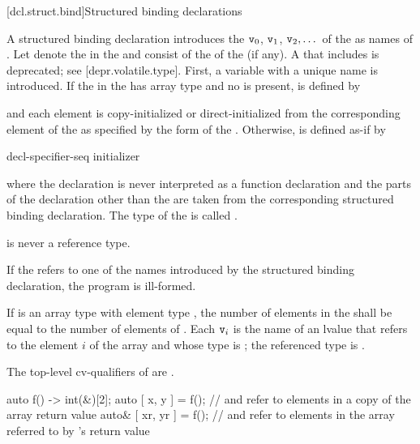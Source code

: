 \documentclass{wg21}
\begin{document}
[dcl.struct.bind]{Structured binding declarations}%

\pnum
A structured binding declaration introduces the 
$\texttt{v}_0$, $\texttt{v}_1$, $\texttt{v}_2, \dotsc$
of the
 as names
of .
Let \cv{} denote the  in
the  and
 consist of the  of
the  (if any).
A \cv{} that includes  is deprecated;
see [depr.volatile.type].
First, a variable with a unique name  is introduced. If the
 in the 
has array type   and no  is present,
 is defined by
\begin{ncbnf}
      \cv{}   \terminal{;}
\end{ncbnf}
and each element is copy-initialized or direct-initialized
from the corresponding element of the  as specified
by the form of the .
Otherwise, 
is defined as-if by
\begin{ncbnf}
     decl-specifier-seq   initializer \terminal{;}
\end{ncbnf}
where
the declaration is never interpreted as a function declaration and
the parts of the declaration other than the  are taken
from the corresponding structured binding declaration.
The type of the 
 is called .
\begin{note}
     is never a reference type.
\end{note}

\pnum
If the  refers to
one of the names introduced by the structured binding declaration,
the program is ill-formed.

\pnum
If  is an array type with element type , the number
of elements in the  shall be equal to the
number of elements of . Each $\texttt{v}_i$ is the name of an
lvalue that refers to the element $i$ of the array and whose type
is ; the referenced type is .
\begin{note}
    The top-level cv-qualifiers of  are \cv.
\end{note}
\begin{example}
    \begin{codeblock}
        auto f() -> int(&)[2];
        auto [ x, y ] = f();            //  and  refer to elements in a copy of the array return value
        auto& [ xr, yr ] = f();         //  and  refer to elements in the array referred to by 's return value
    \end{codeblock}
\end{example}
\end{document}
